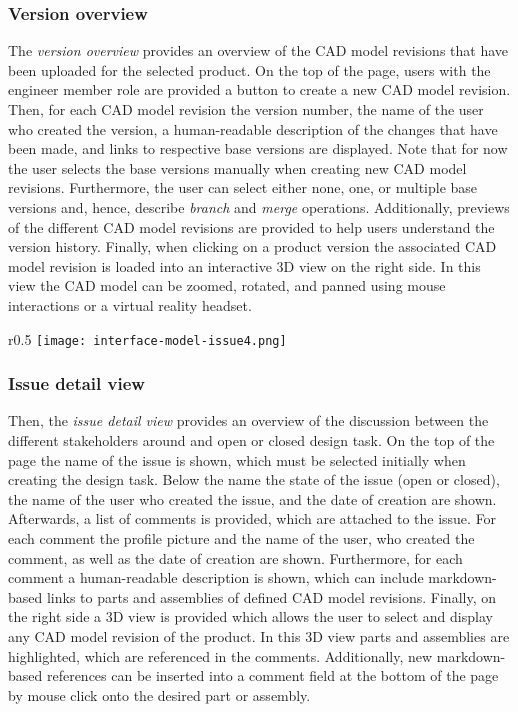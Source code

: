 \subsubsection{Version overview}

The \textit{version overview} provides an overview of the CAD model revisions that have been uploaded for the selected product.
On the top of the page, users with the engineer member role are provided a button to create a new CAD model revision.
Then, for each CAD model revision the version number, the name of the user who created the version, a human-readable description of the changes that have been made, and links to respective base versions are displayed.
Note that for now the user selects the base versions manually when creating new CAD model revisions.
Furthermore, the user can select either none, one, or multiple base versions and, hence, describe \textit{branch} and \textit{merge} operations.
Additionally, previews of the different CAD model revisions are provided to help users understand the version history.
Finally, when clicking on a product version the associated CAD model revision is loaded into an interactive 3D view on the right side.
In this view the CAD model can be zoomed, rotated, and panned using mouse interactions or a virtual reality headset.

\begin{wrapfigure}{r}{0.5\textwidth}
    \centering
    \texttt{[image: interface-model-issue4.png]}
    \label{fig:screenshot-issue}
\end{wrapfigure}

\subsubsection{Issue detail view}

Then, the \textit{issue detail view} provides an overview of the discussion between the different stakeholders around and open or closed design task.
On the top of the page the name of the issue is shown, which must be selected initially when creating the design task.
Below the name the state of the issue (open or closed), the name of the user who created the issue, and the date of creation are shown.
Afterwards, a list of comments is provided, which are attached to the issue.
For each comment the profile picture and the name of the user, who created the comment, as well as the date of creation are shown.
Furthermore, for each comment a human-readable description is shown, which can include markdown-based links to parts and assemblies of defined CAD model revisions.
Finally, on the right side a 3D view is provided which allows the user to select and display any CAD model revision of the product.
In this 3D view parts and assemblies are highlighted, which are referenced in the comments.
Additionally, new markdown-based references can be inserted into a comment field at the bottom of the page by mouse click onto the desired part or assembly.

